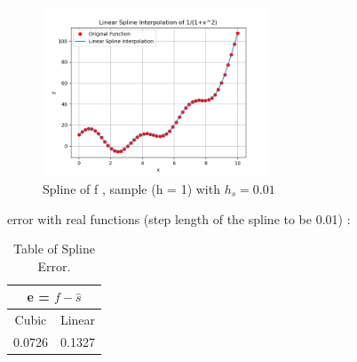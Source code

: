 \documentclass[12pt]{article}
\begin{document}
\begin{itemize}
\begin{figure}[h]
\end{figure}\\

\begin{figure}[h]
    \centering
    \includegraphics[width=0.6\textwidth]{img/Spline_Linear2}
    \caption{Spline of f , sample (h = 1) with $h_s = 0.01$}
    \label{fig:mesh1}
\end{figure}

\newpage

error with real functions (step length of the spline to be 0.01) : \\
\begin{table}[h!]
  \begin{center}
    \caption{Table of Spline Error.}
    \label{tab:table1}
    \begin{tabular}{c|c}
      \multicolumn{2}{c}{e = $f - \hat{s}$}\\
      \hline
      \multirow{1}{*}{Cubic} & \multirow{1}{*}{Linear} \\
      \hline
      \multirow{2}{*}{0.0726} & \multirow{2}{*}{0.1327}
      
    \end{tabular}
  \end{center}
\end{table}

\end{itemize}
\end{document}
